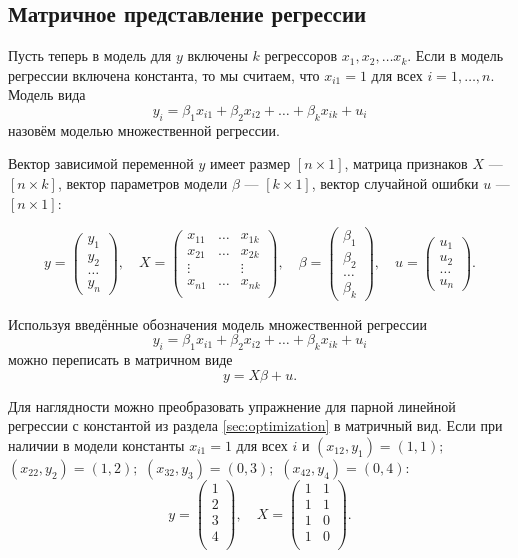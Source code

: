 \documentclass[12pt]{article}
\begin{document}
\subsection{Матричное представление регрессии}
Пусть теперь в модель для $y$ включены $k$ регрессоров $x_1, x_2, \dots x_k$. 
Если в модель регрессии включена константа, то мы считаем, что $x_{i1}=1$ для всех $i=1, \dots, n$.
Модель вида
\[
y_i = \beta_1 x_{i1} + \beta_2 x_{i2} + \dots + \beta_k x_{ik} + u_i
\]
назовём моделью множественной регрессии.

Вектор зависимой переменной $y$ имеет размер $[n \times 1]$, матрица признаков $X$ —  $[n \times k]$, вектор параметров модели $\beta$ — $[k \times 1]$, вектор случайной ошибки $u$ — $[n \times 1]$:

\[
y =  \begin{pmatrix}
y_1 \\
y_2 \\
\dots \\
y_n
 \end{pmatrix},\quad
X = \begin{pmatrix}
    x_{11} & \dots & x_{1k} \\
    x_{21} & \dots & x_{2k} \\
    \vdots &   & \vdots \\
    x_{n1} & \dots & x_{nk} \\
\end{pmatrix}, \quad
\beta = \begin{pmatrix}
    \beta_1\\
    \beta_2\\
    \dots \\
    \beta_k
\end{pmatrix}, \quad
u =  \begin{pmatrix}
u_1 \\
u_2 \\
\dots \\
u_n
 \end{pmatrix}.
\]

Используя введённые обозначения модель множественной регрессии
\[
y_i = \beta_1 x_{i1} + \beta_2 x_{i2} + \dots + \beta_k x_{ik} + u_i
\]
можно переписать в матричном виде
\[
y = X\beta + u.
\]

Для наглядности можно преобразовать упражнение для парной линейной регрессии с константой из раздела \ref{sec:optimization} в матричный вид. Если при наличии в модели константы $x_{i1} = 1$ для всех $i$ и $(x_{12}, y_1) = (1, 1);$ $(x_{22}, y_2) = (1, 2);$ $(x_{32}, y_3) = (0, 3);$ $(x_{42}, y_4) = (0, 4)$: 
\[
y = \begin{pmatrix}
    1 \\
    2 \\
    3 \\
    4 \\
\end{pmatrix}, \quad 
X = \begin{pmatrix}
    1 & 1 \\
    1 & 1 \\
    1 & 0 \\
    1 & 0 \\
\end{pmatrix}.
\]
\end{document}
